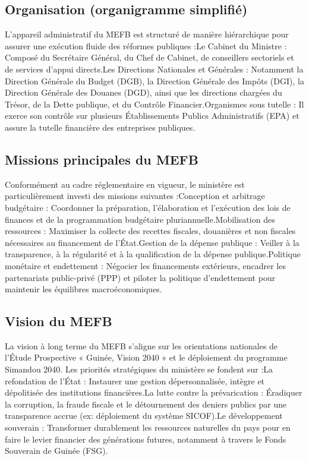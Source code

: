 \documentclass[12pt,a4paper]{article}
\begin{document}
\subsection{Organisation (organigramme simplifié)}

L’appareil administratif du MEFB est structuré de manière hiérarchique pour assurer une exécution fluide des réformes publiques :Le Cabinet du Ministre : Composé du Secrétaire Général, du Chef de Cabinet, de conseillers sectoriels et de services d'appui directs.Les Directions Nationales et Générales : Notamment la Direction Générale du Budget (DGB), la Direction Générale des Impôts (DGI), la Direction Générale des Douanes (DGD), ainsi que les directions chargées du Trésor, de la Dette publique, et du Contrôle Financier.Organismes sous tutelle : Il exerce son contrôle sur plusieurs Établissements Publics Administratifs (EPA) et assure la tutelle financière des entreprises publiques.

\subsection{Missions principales du MEFB}

Conformément au cadre réglementaire en vigueur, le ministère est particulièrement investi des missions suivantes :Conception et arbitrage budgétaire : Coordonner la préparation, l'élaboration et l'exécution des lois de finances et de la programmation budgétaire pluriannuelle.Mobilisation des ressources : Maximiser la collecte des recettes fiscales, douanières et non fiscales nécessaires au financement de l'État.Gestion de la dépense publique : Veiller à la transparence, à la régularité et à la qualification de la dépense publique.Politique monétaire et endettement : Négocier les financements extérieurs, encadrer les partenariats public-privé (PPP) et piloter la politique d'endettement pour maintenir les équilibres macroéconomiques.

\subsection{Vision du MEFB}

La vision à long terme du MEFB s'aligne sur les orientations nationales de l'Étude Prospective « Guinée, Vision 2040 » et le déploiement du programme Simandou 2040. Les priorités stratégiques du ministère se fondent sur :La refondation de l'État : Instaurer une gestion dépersonnalisée, intègre et dépolitisée des institutions financières.La lutte contre la prévarication : Éradiquer la corruption, la fraude fiscale et le détournement des deniers publics par une transparence accrue (ex: déploiement du système SICOF).Le développement souverain : Transformer durablement les ressources naturelles du pays pour en faire le levier financier des générations futures, notamment à travers le Fonds Souverain de Guinée (FSG).
\end{document}
